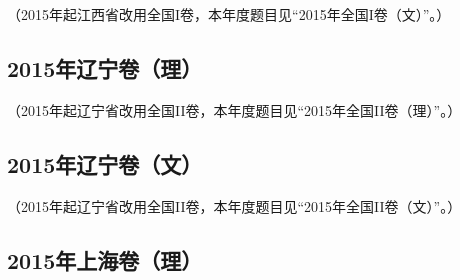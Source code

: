 （2015年起江西省改用全国I卷，本年度题目见“2015年全国I卷（文）”。）


\subsection{2015年辽宁卷（理）}\label{gk:2015年辽宁卷（理）}

（2015年起辽宁省改用全国II卷，本年度题目见“2015年全国II卷（理）”。）


\subsection{2015年辽宁卷（文）}\label{gk:2015年辽宁卷（文）}

（2015年起辽宁省改用全国II卷，本年度题目见“2015年全国II卷（文）”。）


\subsection{2015年上海卷（理）}\label{gk:2015年上海卷（理）}

